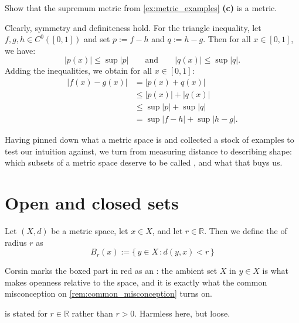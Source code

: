 \begin{exercise}
\label{ex:sup_metric_is_metric}
Show that the supremum metric from \cref{ex:metric_examples} \textbf{(c)} is a metric.
\end{exercise}

\begin{exercisesolution}
Clearly, symmetry and definiteness hold. For the triangle inequality, let $f, g, h \in C^0([0,1])$ and
set $p := f - h$ and $q := h - g$. Then for all $x \in [0,1]$, we have:
\[|p(x)| \leq \sup|p| \qquad \text{and} \qquad |q(x)| \leq \sup|q|.\]
Adding the inequalities, we obtain for all $x \in [0,1]$:
\begin{align*}
|f(x) - g(x)| &= |p(x) + q(x)| \\
&\leq |p(x)| + |q(x)| \\
&\leq \sup|p| + \sup|q| \\
&= \sup|f - h| + \sup|h - g|.
\end{align*}
\end{exercisesolution}

Having pinned down what a metric space is and collected a stock of examples to test our intuition
against, we turn from measuring distance to describing shape: which subsets of a metric space
deserve to be called , and what that buys us.

\section{Open and closed sets}
\label{sec:open_closed_sets}

\begin{definition}
\label{def:open_ball}
Let $(X,d)$ be a metric space, let $x \in X$, and let $r \in \mathbb{R}$. Then we define the
 of radius $r$ as
\[B_r(x) := \{\,\boxed{y \in X}\, : d(y,x) < r\,\}\]
\end{definition}

\begin{importantremark}
Corsin marks the boxed part in red as an : the ambient set $X$ in
$y \in X$ is what makes openness relative to the space, and it is exactly what the common
misconception on \cref{rem:common_misconception} turns on.
\end{importantremark}

\begin{ainote}
 is stated for $r \in \mathbb{R}$ rather than $r > 0$. Harmless here, but
loose.
\end{ainote}

